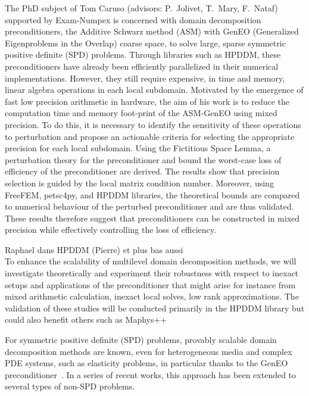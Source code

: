 {\color{blue} The PhD subject of Tom Caruso (advisors: P.~Jolivet, T.~Mary, F.~Nataf) supported by Exam-Numpex is concerned with domain decomposition preconditioners, the Additive Schwarz method (ASM) with GenEO (Generalized Eigenproblems in the Overlap) coarse space, to solve large, sparse symmetric positive definite (SPD) problems. 
Through libraries such as HPDDM, these preconditioners have already been efficiently parallelized in their numerical implementations. 
However, they still require expensive, in time and memory, linear algebra operations in each local subdomain. 
Motivated by the emergence of fast low precision arithmetic in hardware, the aim of his work is to reduce the computation time and memory foot-print of the ASM-GenEO using mixed precision. 
To do this, it is necessary to identify the sensitivity of these operations to perturbation and propose an actionable criteria for selecting the appropriate precision for each local subdomain.
Using the Fictitious Space Lemma, a perturbation theory for the preconditioner and bound the worst-case loss of efficiency of the preconditioner are derived. The results show that  precision selection is guided by the local matrix condition number. 
Moreover, using FreeFEM, petsc4py, and HPDDM libraries, the theoretical bounds are compared to numerical behaviour of the perturbed preconditioner and are thus validated. 
These results therefore suggest that preconditioners can be constructed in mixed precision while effectively controlling the loss of efficiency.}


 
 Raphael dans HPDDM (Pierre) et plus bas aussi \\
 
 
 
To enhance the scalability of
multilevel domain decomposition methods, we will investigate theoretically and experiment their
robustness with respect to inexact setups and applications of the preconditioner that might arise for
instance from mixed arithmetic calculation, inexact local solves, low rank approximations. The
validation of these studies will be conducted primarily in the HPDDM library but could also benefit
others such as Maphys++

\bigskip

For symmetric positive definite (SPD) problems, provably scalable domain decomposition methods are known, even for heterogeneous media and complex PDE systems, such as elasticity problems, in particular thanks to the GenEO preconditioner~\cite{Spillane:2014:ASC, Dolean:2015:IDDSiam}. In a series of recent works, this approach has been extended to several types of non-SPD problems.

